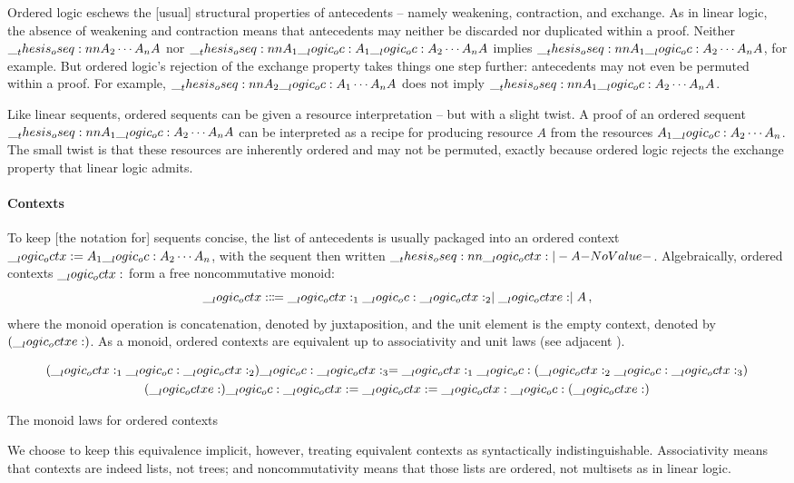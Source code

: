 Ordered logic eschews the [usual] structural properties of antecedents -- namely weakening, contraction, and exchange.
As in linear logic, the absence of weakening and contraction means that
antecedents
may neither be discarded nor duplicated within a proof.
Neither $\oseq{A_2 \dotsb A_n |- A}$ nor $\oseq{A_1 \oc A_1 \oc A_2 \dotsb A_n |- A}$ implies $\oseq{A_1 \oc A_2 \dotsb A_n |- A}$, for example. 
But ordered logic's rejection of the exchange property takes things one step further: antecedents may not even be permuted within a proof.
For example, $\oseq{A_2 \oc A_1 \dotsb A_n |- A}$ does not imply $\oseq{A_1 \oc A_2 \dotsb A_n |- A}$.

Like linear sequents\autocite{Girard:TCS87}, ordered sequents can be given a resource interpretation -- but with a slight twist.
A proof of an ordered sequent
$\oseq{A_1 \oc A_2 \dotsb A_n |- A}$
can be interpreted as a recipe for producing resource $A$ from the resources $A_1 \__logic_oc: A_2 \dotsb A_n$.
The small twist is that these resources are inherently ordered and may not be permuted, exactly because ordered logic rejects the exchange property that linear logic admits.

\paragraph{Contexts}
To keep [the notation for] sequents concise, the list of antecedents is usually packaged into an ordered context $\__logic_octx: = A_1 \__logic_oc: A_2 \dotsb A_n$, with the sequent then written $\oseq{\octx |- A}$.
Algebraically, ordered contexts $\__logic_octx:$ form a free noncommutative monoid:
\begin{equation*}
  \__logic_octx: \Coloneqq \__logic_octx:_1 \__logic_oc: \__logic_octx:_2 \mid \__logic_octxe: \mid A \,,
\end{equation*}
where the monoid operation is concatenation, denoted by juxtaposition, and the unit element is the empty context, denoted by $(\__logic_octxe:)$.
As a monoid, ordered contexts are equivalent up to associativity and unit laws (see adjacent ).%
\begin{marginfigure}
  \begin{gather*}
    (\__logic_octx:_1 \__logic_oc: \__logic_octx:_2) \__logic_oc: \__logic_octx:_3 = \__logic_octx:_1 \__logic_oc: (\__logic_octx:_2 \__logic_oc: \__logic_octx:_3) \\
    (\__logic_octxe:) \__logic_oc: \__logic_octx: = \__logic_octx: = \__logic_octx: \__logic_oc: (\__logic_octxe:)
  \end{gather*}
  \caption{The monoid laws for ordered contexts}\label{fig:ordered-logic:monoid-laws}
\end{marginfigure}
We choose to keep this equivalence implicit, however, treating equivalent contexts as syntactically indistinguishable.
%
Associativity means that contexts are indeed lists, not trees; and noncommutativity means that those lists are ordered, not multisets as in linear logic.



